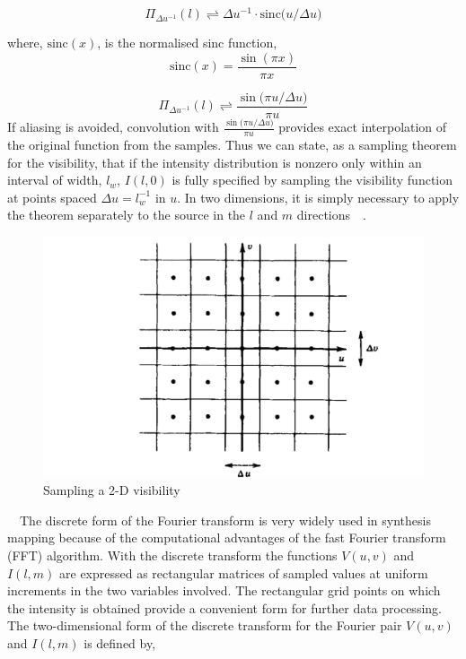 \begin{equation}
\Pi_{\Delta{u}^{-1}}(l) \rightleftharpoons {\Delta{u}^{-1}}\cdot\textrm{sinc}(u/{\Delta{u})}
\end{equation}

where, $\textrm{sinc}(x)$, is the normalised sinc function,
\begin{equation}
\textrm{sinc}(x) = \frac{\sin(\pi{x})}{\pi{x}}
\end{equation}

\begin{equation}
\Pi_{\Delta{u}^{-1}}(l) \rightleftharpoons \frac{\sin(\pi{u/{\Delta{u}})}}{\pi{u}}
\end{equation}
If aliasing is avoided, convolution with $\frac{\sin(\pi{u/{\Delta{u}})}}{\pi{u}}$ provides exact interpolation of the original function from the samples. Thus we can state, as a sampling theorem for the visibility, that if the intensity distribution is nonzero only within an interval of width, $l_w$, $I(l,0)$ is fully specified by sampling the visibility function at points spaced $\Delta{u} = l_w^{-1}$ in $u$. In two dimensions, it is simply necessary to apply the theorem separately to the source in the $l$ and $m$ directions{~\citep[Pg. 127]{thompson2008interferometry}}~.\\
\begin{figure}[htbp]
\center
    \includegraphics[scale= 0.3]{Figures/sampling2d}
 	\caption[Sampling a 2-D visibility  ]{Sampling a 2-D visibility~\citep[Pg.~129,~Fig.~5.3]{thompson2008interferometry}}
	\label{fig:Sampling2D}
\end{figure}
{~\citep[From][Pg. 128,~Sec.~5.2]{thompson2008interferometry}}~The discrete form of the Fourier transform is very widely used in synthesis mapping because of the computational advantages of the fast Fourier transform (FFT) algorithm. With the discrete transform the functions $V(u, v )$ and $I(l , m)$ are expressed as rectangular matrices of sampled values at uniform increments in the two variables involved. The rectangular grid points on which the intensity is obtained provide a convenient form for further data processing. The two-dimensional form of the discrete transform for the Fourier pair $V(u,v)$ and $I(l,m)$ is defined by,
